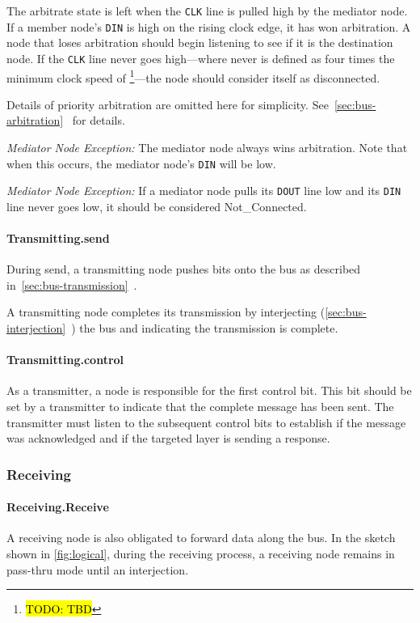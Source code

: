 The {\sc arbitrate} state is left when the {\tt CLK} line is pulled high by
the mediator node. If a member node's {\tt DIN} is high on the rising clock
edge, it has won arbitration. A node that loses arbitration should begin
listening to see if it is the destination node. If the {\tt CLK} line never
goes high---where never is defined as four times the minimum clock speed of
\bus\footnote{\hl{TODO: TBD}}---the node should consider itself as
disconnected.

Details of priority arbitration are omitted here for simplicity.
See~\ref{sec:bus-arbitration}~ for
details.

\medskip
\noindent
{\em Mediator Node Exception:} The mediator node always wins arbitration. Note
that when this occurs, the mediator node's {\tt DIN} will be low.

\medskip
\noindent
{\em Mediator Node Exception:} If a mediator node pulls its {\tt DOUT} line low
and its {\tt DIN} line never goes low, it should be considered
{\sc Not\_Connected}.

\paragraph{Transmitting.{\sc send}}
During {\sc send}, a transmitting node pushes bits onto the bus as described
in~\ref{sec:bus-transmission}~.

A transmitting node completes its transmission by interjecting
(\ref{sec:bus-interjection}~) the bus
and indicating the transmission is complete.

\paragraph{Transmitting.{\sc control}}
As a transmitter, a node is responsible for the first control bit. This bit
should be set by a transmitter to indicate that the complete message has been
sent. The transmitter must listen to the subsequent control bits to establish
if the message was acknowledged and if the targeted layer is sending a
response.

\subsubsection{Receiving}

\paragraph{Receiving.{\sc Receive}}
A receiving node is also obligated to forward data along the bus. In the
sketch shown in \cref{fig:logical}, during the receiving process, a
receiving node remains in pass-thru mode until an interjection.

